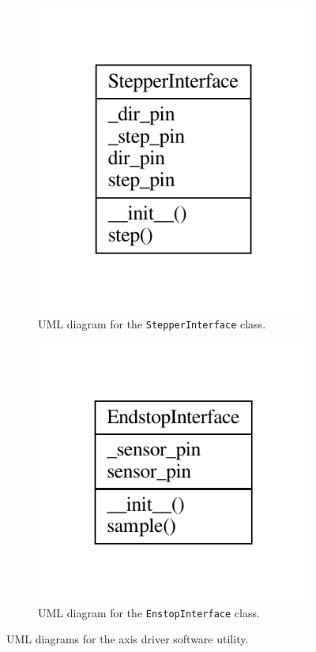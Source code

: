 \documentclass{article}
\begin{document}
\begin{figure}[H]
    \ContinuedFloat
    \begin{subfigure}{0.5\textwidth}
        \centering
        \includegraphics{images/UML/axis_driver/stepper_interface.pdf}
        \caption{UML diagram for the \texttt{StepperInterface} class.}
        \label{fig:axis_uml_stepper}
    \end{subfigure}
    \begin{subfigure}{0.5\textwidth}
        \centering
        \includegraphics{images/UML/axis_driver/endstop_interface.pdf}
        \caption{UML diagram for the \texttt{EnstopInterface} class.}
        \label{fig:axis_uml_endstop}
    \end{subfigure}
    \caption{UML diagrams for the axis driver software utility.}
    \label{fig:axis_uml}
\end{figure}
\end{document}
